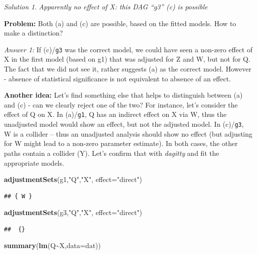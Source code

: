 \documentclass[
]{book}
\newenvironment{Shaded}{\begin{snugshade}}{\end{snugshade}}
\newcommand{\AttributeTok}[1]{\textcolor[rgb]{0.13,0.29,0.53}{#1}}
\newcommand{\FunctionTok}[1]{\textcolor[rgb]{0.13,0.29,0.53}{\textbf{#1}}}
\newcommand{\NormalTok}[1]{#1}
\newcommand{\SpecialCharTok}[1]{\textcolor[rgb]{0.81,0.36,0.00}{\textbf{#1}}}
\newcommand{\StringTok}[1]{\textcolor[rgb]{0.31,0.60,0.02}{#1}}
\theoremstyle{definition}
\theoremstyle{definition}
\theoremstyle{definition}
\theoremstyle{definition}
\theoremstyle{remark}
\newtheorem*{solution}{Solution}
\begin{document}
\begin{solution}
\emph{Apparently no effect of X: this DAG ``g3'' (c) is possible}

\textbf{Problem:} Both (a) and (c) are possible, based on the fitted models. How to make a distinction?

\emph{Answer 1:} If (c)/\texttt{g3} was the correct model, we could have seen a non-zero effect of X in the first model (based on g1) that was adjusted for Z and W, but not for Q. The fact that we did not see it, rather suggests (a) as the correct model. However - absence of statistical significance is not equivalent to absence of an effect.

\textbf{Another idea:} Let's find something else that helps to distinguish between (a) and (c) - can we clearly reject one of the two? For instance, let's consider the effect of Q on X. In (a)/\texttt{g1}, Q has an indirect effect on X via W, thus the unadjusted model would show an effect, but not the adjusted model. In (c)/\texttt{g3}, W is a collider -- thus an unadjusted analysis should show no effect (but adjusting for W might lead to a non-zero parameter estimate). In both cases, the other paths contain a collider (Y). Let's confirm that with \emph{dagitty} and fit the appropriate models.

\begin{Shaded}
\begin{Highlighting}[]
\FunctionTok{adjustmentSets}\NormalTok{(g1,}\StringTok{"Q"}\NormalTok{,}\StringTok{"X"}\NormalTok{, }\AttributeTok{effect=}\StringTok{"direct"}\NormalTok{)}
\end{Highlighting}
\end{Shaded}

\begin{verbatim}
## { W }
\end{verbatim}

\begin{Shaded}
\begin{Highlighting}[]
\FunctionTok{adjustmentSets}\NormalTok{(g3,}\StringTok{"Q"}\NormalTok{,}\StringTok{"X"}\NormalTok{, }\AttributeTok{effect=}\StringTok{"direct"}\NormalTok{)}
\end{Highlighting}
\end{Shaded}

\begin{verbatim}
##  {}
\end{verbatim}

\begin{Shaded}
\begin{Highlighting}[]
\FunctionTok{summary}\NormalTok{(}\FunctionTok{lm}\NormalTok{(Q}\SpecialCharTok{\textasciitilde{}}\NormalTok{X,}\AttributeTok{data=}\NormalTok{dat))}
\end{Highlighting}
\end{Shaded}


\end{solution}
\end{document}
